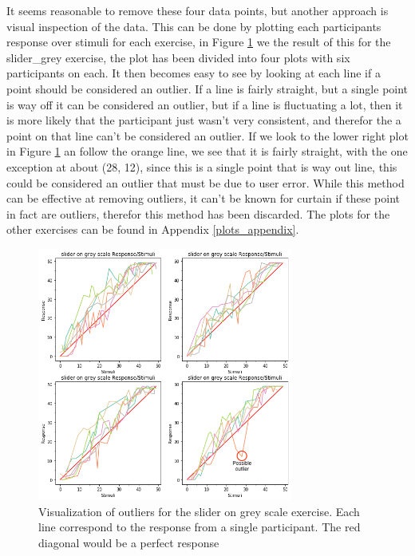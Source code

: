 It seems reasonable to remove these four data points, but another approach is visual inspection of the data. This can be done by plotting each participants response over stimuli for each exercise, in Figure \ref{visual_out} we the result of this for the slider\_grey exercise, the plot has been divided into four plots with six participants on each. It then becomes easy to see by looking at each line if a point should be considered an outlier. If a line is fairly straight, but a single point is way off it can be considered an outlier, but if a line is fluctuating a lot, then it is more likely that the participant just wasn't very consistent, and therefor the a point on that line can't be considered an outlier. If we look to the lower right plot in Figure \ref{visual_out} an follow the orange line, we see that it is fairly straight, with the one exception at about (28, 12), since this is a single point that is way out line, this could be considered an outlier that must be due to user error. While this method can be effective at removing outliers, it can't be known for curtain if these point in fact are outliers, therefor this method has been discarded. The plots for the other exercises can be found in Appendix \ref{plots_appendix}.

\begin{figure}[]
    \centering
    \includegraphics[width=0.75\textwidth]{figures/visual_out0.png}
    \caption{Visualization of outliers for the slider on grey scale exercise. Each line correspond to the response from a single participant. The red diagonal would be a perfect response}
    \label{visual_out}
\end{figure}

